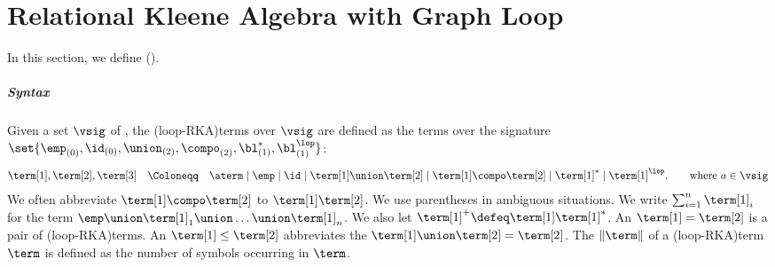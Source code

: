 %
%
%
%
%
%
%
%
%
%
%
%
%
%
%
%
%
%

%
%
%
%
%
%
%
%

%
%
%
%
%
%
%
%
%
%
%
%
%
%
%
%
%
%
%
%
%
%
%
%
%
%
%
%
%
%
%
%
%
%
%
%
%
%
%
%
%
%
%
%
%
%
%
%
%
%
%
%
%

%
%
%
%
%
%
%
%
%
%
%
%
%
%
%
%
%
%
%
%
%
%
%
%
%
%
%
%
%
%
%
%
%
%
%
%
%
%
%
%
%
%
%
%
%
%
%
%
%
%
%
%
%
%
%
%
%
%
%

%
%
%
%
%
%
%

\section{Relational Kleene Algebra with Graph Loop}\label{section: RKA with graph loop}
\AP
In this section,
we define \intro*{} (\reintro*{}).

\subparagraph*{Syntax}
\AP
Given a set $\vsig$ of \intro*{},
the \intro*\kl(loop-RKA){terms} over $\vsig$ 
are defined as the terms over the signature $\set{\emp_{(0)}, \id_{(0)}, \union_{(2)}, \compo_{(2)}, \bl^{*}_{(1)}, \bl^{\lop}_{(1)}}$: 
\begin{align*}
    \term[1], \term[2], \term[3] \quad\Coloneqq\quad \aterm \mid \emp \mid \id \mid \term[1] \union \term[2] \mid \term[1] \compo \term[2] \mid \term[1]^* \mid \term[1]^{\lop}. \tag*{where $a \in \vsig$}
\end{align*}
We often abbreviate $\term[1] \compo \term[2]$ to $\term[1] \term[2]$.
We use parentheses in ambiguous situations.
We write $\sum_{i = 1}^{n} \term[1]_i$ for the term $\emp \union \term[1]_1 \union \dots \union \term[1]_n$.
We also let $\term[1]^{+} \defeq \term[1] \term[1]^*$.
\AP
An \intro*{} $\term[1] = \term[2]$ is a pair of \kl(loop-RKA){terms}.
An \intro*{} $\term[1] \le \term[2]$ abbreviates the  $\term[1] \union \term[2] = \term[2]$.
The \intro*{} $\|\term\|$ of a \kl(loop-RKA){term} $\term$ is defined as the number of symbols occurring in $\term$.

%
%
%
%
%
%
%
%
%
%
%

